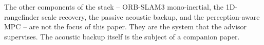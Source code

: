 The other components of the stack -- ORB-SLAM3 mono-inertial, the
1D-rangefinder scale recovery, the passive acoustic backup, and the
perception-aware MPC -- are not the focus of this paper. They are
the system that the advisor supervises. The acoustic backup itself
is the subject of a companion paper.
